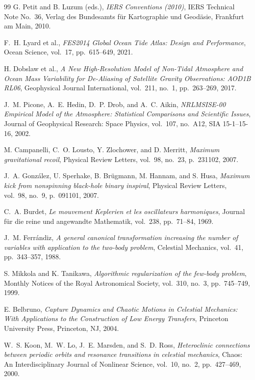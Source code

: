 \documentclass[11pt,a4paper,reqno]{article}
\theoremstyle{plain}
\theoremstyle{definition}
\theoremstyle{remark}
\numberwithin{equation}{section}
\begin{document}
\begin{thebibliography}{99}
G. Petit and B. Luzum (eds.),
\emph{IERS Conventions (2010)},
IERS Technical Note No.~36, Verlag des Bundesamts f\"{u}r Kartographie und Geod\"{a}sie, Frankfurt am Main, 2010.

F.~H. Lyard et al.,
\emph{FES2014 Global Ocean Tide Atlas: Design and Performance},
Ocean Science, vol.~17, pp.~615--649, 2021.

H. Dobslaw et al.,
\emph{A New High-Resolution Model of Non-Tidal Atmosphere and Ocean Mass Variability for De-Aliasing of Satellite Gravity Observations: AOD1B RL06},
Geophysical Journal International, vol.~211, no.~1, pp.~263--269, 2017.

J.~M. Picone, A.~E. Hedin, D.~P. Drob, and A.~C. Aikin,
\emph{NRLMSISE-00 Empirical Model of the Atmosphere: Statistical Comparisons and Scientific Issues},
Journal of Geophysical Research: Space Physics, vol.~107, no.~A12, SIA 15-1--15-16, 2002.


M. Campanelli, C.~O. Lousto, Y. Zlochower, and D. Merritt,
\emph{Maximum gravitational recoil},
Physical Review Letters, vol.~98, no.~23, p.~231102, 2007.

J.~A. Gonz\'{a}lez, U. Sperhake, B. Br\"{u}gmann, M. Hannam, and S. Husa,
\emph{Maximum kick from nonspinning black-hole binary inspiral},
Physical Review Letters, vol.~98, no.~9, p.~091101, 2007.

C.~A. Burdet,
\emph{Le mouvement Keplerien et les oscillateurs harmoniques},
Journal f\"{u}r die reine und angewandte Mathematik, vol.~238, pp.~71--84, 1969.

J.~M. Ferr\'{a}ndiz,
\emph{A general canonical transformation increasing the number of variables with application to the two-body problem},
Celestial Mechanics, vol.~41, pp.~343--357, 1988.

S. Mikkola and K. Tanikawa,
\emph{Algorithmic regularization of the few-body problem},
Monthly Notices of the Royal Astronomical Society, vol.~310, no.~3, pp.~745--749, 1999.

E. Belbruno,
\emph{Capture Dynamics and Chaotic Motions in Celestial Mechanics: With Applications to the Construction of Low Energy Transfers},
Princeton University Press, Princeton, NJ, 2004.

W.~S. Koon, M.~W. Lo, J.~E. Marsden, and S.~D. Ross,
\emph{Heteroclinic connections between periodic orbits and resonance transitions in celestial mechanics},
Chaos: An Interdisciplinary Journal of Nonlinear Science, vol.~10, no.~2, pp.~427--469, 2000.

\end{thebibliography}
\end{document}
